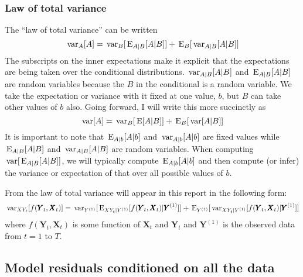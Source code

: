 \documentclass[]{article}
\def\UPS{\mbox{\boldmath $\Upsilon$}}
\def\AA{\mbox{$\mathbf A$}}	\def\aa{\mbox{$\mathbf a$}}
\def\BB{\mbox{$\mathbf B$}}	\def\bb{\mbox{$\mathbf b$}} \def\Bb{\mbox{$\mathbf J$}} \def\Ba{\mbox{$\mathbf L$}} \def\Bm{\UPS}
\def\E{\,\textup{\textrm{E}}}
\def\XX{\mbox{$\pmb{X}$}}	\def\xx{\mbox{$\pmb{x}$}}
\def\YY{\mbox{$\pmb{Y}$}}	\def\yy{\mbox{$\pmb{y}$}}
\def\var{\,\textup{\textrm{var}}}
\begin{document}
\subsubsection{Law of total variance}

The ``law of total variance'' can be written
\begin{equation}\label{eq:lawoftotvar}
\var_A[A] = \var_B[\E_{A|B}[A|B]] + \E_B[\var_{A|B}[A|B]]
\end{equation}
The subscripts on the inner expectations make it explicit that the expectations are being taken over the conditional distributions.  $\var_{A|B}[A|B]$ and $\E_{A|B}[A|B]$ are random variables because the $B$ in the conditional is a random variable. We take the expectation or variance with it fixed at one value, $b$, but $B$ can take other values of $b$ also.  Going forward, I will write this more succinctly as
\begin{equation}
\var[A] = \var_B[\E[A|B]] + \E_B[\var[A|B]]
\end{equation}
It is important to note that $\E_{A|b}[A|b]$ and $\var_{A|b}[A|b]$ are fixed values while $\E_{A|B}[A|B]$ and $\var_{A|B}[A|B]$ are random variables. When computing $\var[\E_{A|B}[A|B]]$, we will typically compute $\E_{A|b}[A|b]$ and then compute (or infer) the variance or expectation of that over all possible values of $b$. 

From the law of total variance will appear in this report in the following form:
\begin{equation}
\var_{XY_t}[f(\YY_t,\XX_t)] = \var_{Y^{(1)}}[\E_{XY_t|Y^{(1)}}[f(\YY_t,\XX_t)|\YY^{(1)}]] + \E_{Y^{(1)}}[\var_{XY_t|Y^{(1)}}[f(\YY_t,\XX_t)|\YY^{(1)}]]
\end{equation}
where $f(\YY_t,\XX_t)$ is some function of $\XX_t$ and $\YY_t$ and $\YY^{(1)}$ is the observed data from $t=1$ to $T$. 



\subsection{Model residuals conditioned on all the data}
\end{document}

